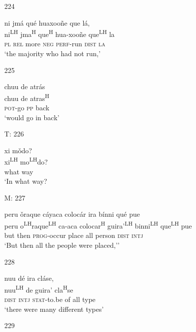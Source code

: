 \begin{itemize}
\item[224]
 
\glll  ni jm\'{a} qu\'{e} huaxoo\~{n}e que l\'{a}, \\
ni\textsuperscript{LH} jma\textsuperscript{H} que\textsuperscript{H} hua-xoo\~{n}e que\textsuperscript{LH} la\\
\textsc{pl} \textsc{rel} more \textsc{neg}  \textsc{perf}-run \textsc{dist} \textsc{la}\\
\glt `the majority who had not run,'
 


\item[225]
 
\glll   chuu de atr\'{a}s\\
chuu de atras\textsuperscript{H}\\
  \textsc{pot}-go \textsc{pp} back\\
\glt `would go in back'
 


\item[T: 226]
 
xi m\v{o}do?\\
xi\textsuperscript{LH} mo\textsuperscript{LH}do?\\
what way\\
\glt `In what way?
 


\item[M: 227]
 
\glll   peru \v{o}raque c\'{a}yaca coloc\'{a}r ira b\'{i}nni qu\'{e} pue\\
 peru o\textsuperscript{LH}raque\textsuperscript{LH} ca-aca colocar\textsuperscript{H} guira'\textsuperscript{LH} binni\textsuperscript{LH}  que\textsuperscript{LH} pue\\
 but then \textsc{prog}-occur place all person \textsc{dist} \textsc{intj} \\
\glt `But then all the people were placed,''
 



\item[228]
 
\glll   nuu d\'{e} ira cl\'{a}se, \\
nuu\textsuperscript{LH} de guira' cla\textsuperscript{H}se\\
\textsc{dist} \textsc{intj} \textsc{stat}-to.be of all type\\
\glt `there were many different types'
 



\item[229]
 

\end{itemize}
